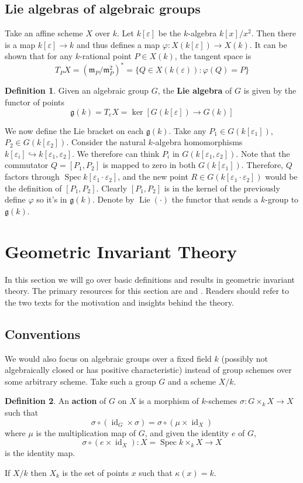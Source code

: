 \documentclass[12pt]{report}
\theoremstyle{remark}
\theoremstyle{definition}
\newtheorem{definition}{Definition}[section]
\newcommand{\ve}[0]{\varepsilon}
\newcommand{\s}[0]{\sigma}
\newcommand{\Spec}[0]{\operatorname{Spec}}
\newcommand{\id}[0]{\operatorname{id}}
\newcommand{\Lie}{\operatorname{Lie}}
\begin{document}
    \subsection{Lie algebras of algebraic groups}
    Take an affine scheme $X$ over $k$. Let $k[\ve]$ be the $k$-algebra $k[x]/x^2$. Then there is a map $k[\ve]\to k$ and thus defines a map $\varphi: X(k[\ve])\to X(k)$. It can be shown that for any $k$-rational point $P\in X(k)$, the tangent space is
    \[T_PX=(\mathfrak m_P/\mathfrak m_P^2)^*=\{Q\in X(k(\ve)):\varphi(Q)=P\}\]
    \begin{definition}
        Given an algebraic group $G$, the \textbf{Lie algebra} of $G$ is given by the functor of points
        \[\mathfrak g(k)=T_eX=\ker[G(k[\ve])\to G(k)]\]
    \end{definition}
    We now define the Lie bracket on each $\mathfrak g(k)$. Take any $P_1\in G(k[\ve_1])$, $P_2\in G(k[\ve_2])$. Consider the natural $k$-algebra homomorphisms $k[\ve_i]\hookrightarrow k[\ve_1, \ve_2]$. We therefore can think $P_i$ in $G(k[\ve_1,\ve_2])$. Note that the commutator $Q=[P_1, P_2]$ is mapped to zero in both $G(k[\ve_1])$. Therefore, $Q$ factors through $\Spec k[\ve_1\cdot\ve_2]$, and the new point $R\in G(k[\ve_1\cdot\ve_2])$ would be the definition of $[P_1,P_2]$. Clearly $[P_1,P_2]$ is in the kernel of the previously define $\varphi$ so it's in $\mathfrak g(k)$. Denote by $\Lie(\cdot)$ the functor that sends a $k$-group to $\mathfrak g(k)$.

    \section{Geometric Invariant Theory}
    In this section we will go over basic definitions and results in geometric invariant theory. The primary resources for this section are \cite{mumford_1994_geometric} and \cite{mukai_2003_an}. Readers should refer to the two texts for the motivation and insights behind the theory.
    \subsection{Conventions}
    We would also focus on algebraic groups over a fixed field $k$ (possibly not algebraically closed or has positive characteristic) instead of group schemes over some arbitrary scheme. Take such a group $G$ and a scheme $X/k$.
    \begin{definition}
        An \textbf{action} of $G$ on $X$ is a morphism of $k$-schemes $\s:G\times_k X\to X$ such that
        \[\s\circ(\id_G\times\s)=\s\circ (\mu\times \id_X)\]
        where $\mu$ is the multiplication map of $G$, and given the identity $e$ of $G$,
        \[\s\circ(e\times \id_X):X=\Spec k\times_k X\to X\]
        is the identity map.
    \end{definition}
    If $X/k$ then $X_k$ is the set of points $x$ such that $\kappa(x)=k$.
\end{document}
